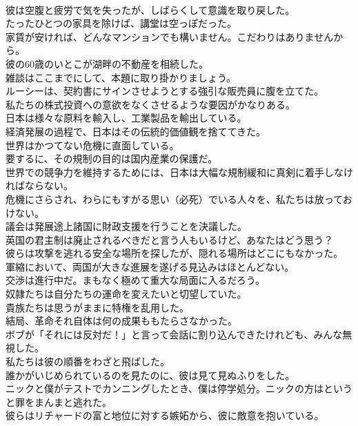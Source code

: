 \documentclass[8pt]{extreport}
\begin{document}
\begin{CJK}{UTF8}{min}
\\	彼は空腹と疲労で気を失ったが、しばらくして意識を取り戻した。
\\	たったひとつの家具を除けば、講堂は空っぽだった。
\\	家賃が安ければ、どんなマンションでも構いません。こだわりはありませんから。
\\	彼の60歳のいとこが湖畔の不動産を相続した。
\\	雑談はここまでにして、本題に取り掛かりましょう。
\\	ルーシーは、契約書にサインさせようとする強引な販売員に腹を立てた。
\\	私たちの株式投資への意欲をなくさせるような要因がかなりある。
\\	日本は様々な原料を輸入し、工業製品を輸出している。
\\	経済発展の過程で、日本はその伝統的価値観を捨ててきた。
\\	世界はかつてない危機に直面している。
\\	要するに、その規制の目的は国内産業の保護だ。
\\	世界での競争力を維持するためには、日本は大幅な規制緩和に真剣に着手しなければならない。
\\	危機にさらされ、わらにもすがる思い（必死）でいる人々を、私たちは放っておけない。
\\	議会は発展途上諸国に財政支援を行うことを決議した。
\\	英国の君主制は廃止されるべきだと言う人もいるけど、あなたはどう思う？
\\	彼らは攻撃を逃れる安全な場所を探したが、隠れる場所はどこにもなかった。
\\	軍縮において、両国が大きな進展を遂げる見込みはほとんどない。
\\	交渉は進行中だ。まもなく極めて重大な局面に入るだろう。
\\	奴隷たちは自分たちの運命を変えたいと切望していた。
\\	貴族たちは思うがままに特権を乱用した。
\\	結局、革命それ自体は何の成果ももたらさなかった。
\\	ボブが「それには反対だ！」と言って会話に割り込んできたけれども、みんな無視した。
\\	私たちは彼の順番をわざと飛ばした。
\\	誰かがいじめられているのを見たのに、彼は見て見ぬふりをした。
\\	ニックと僕がテストでカンニングしたとき、僕は停学処分。ニックの方はというと罪をまんまと逃れた。
\\	彼らはリチャードの富と地位に対する嫉妬から、彼に敵意を抱いている。

\end{CJK}
\end{document}
